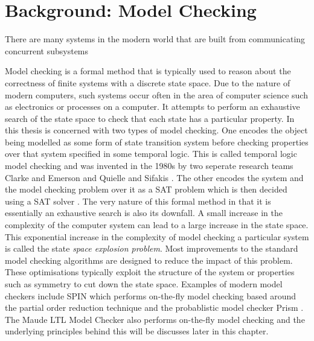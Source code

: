 \chapter{Background: Model Checking}


There are many systems in the modern world that are built from communicating concurrent subsystems 

Model checking is a formal method that is typically used to reason about the correctness of finite systems with a discrete state space. Due to the nature of modern computers, such systems occur often in the area of computer science such as electronics or processes on a computer. It attempts to perform an exhaustive search of the state space to check that each state has a particular property. In this thesis is concerned with two types of model checking. One encodes the object being modelled as some form of state transition system before checking properties over that system specified in some temporal logic. This is called temporal logic model checking and was invented in the 1980s by two seperate research teams  Clarke and Emerson \cite{EM82} and Quielle and Sifakis \cite{JQ82}. The other encodes the system and the model checking problem over it as a SAT problem which is then decided using a SAT solver \cite{MS00}. The very nature of this formal method in that it is essentially an exhaustive search is also its downfall. A small increase in the complexity of the computer system can lead to a large increase in the state space. This exponential increase in the complexity of model checking a particular system is called the state \emph{space explosion problem}. Most improvements to the standard model checking algorithms are designed to reduce the impact of this problem. These optimisations typically exploit the structure of the system or properties such as symmetry to cut down the state space. Examples of modern model checkers include SPIN \cite{GH04} which performs on-the-fly model checking  based around the partial order reduction technique \cite{DP94}  and the probablistic model checker Prism \cite{MK11}. The Maude LTL Model Checker \cite{} also performs on-the-fly model checking and the underlying principles behind this will be discusses later in this chapter.

